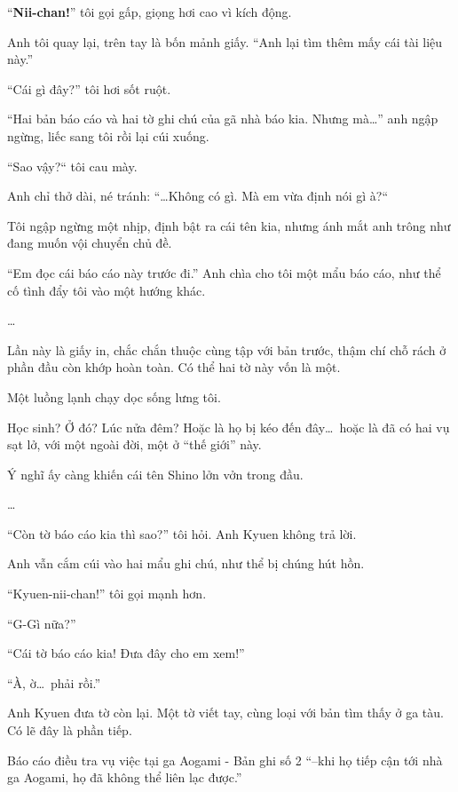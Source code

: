 \documentclass[../main.tex]{subfiles}
\begin{document}
``\textbf{Nii-chan!}'' tôi gọi gấp, giọng hơi cao vì kích động.

Anh tôi quay lại, trên tay là bốn mảnh giấy. ``Anh lại tìm thêm mấy cái tài liệu này.''

``Cái gì đây?'' tôi hơi sốt ruột.

``Hai bản báo cáo và hai tờ ghi chú của gã nhà báo kia. Nhưng mà\dots'' anh ngập ngừng, liếc sang tôi rồi lại cúi xuống.

``Sao vậy?`` tôi cau mày.

Anh chỉ thở dài, né tránh: ``\dots Không có gì. Mà em vừa định nói gì à?``

Tôi ngập ngừng một nhịp, định bật ra cái tên kia, nhưng ánh mắt anh trông như đang muốn vội chuyển chủ đề.

``Em đọc cái báo cáo này trước đi.'' Anh chìa cho tôi một mẩu báo cáo, như thể cố tình đẩy tôi vào một hướng khác.

\dots

Lần này là giấy in, chắc chắn thuộc cùng tập với bản trước, thậm chí chỗ rách ở phần đầu còn khớp hoàn toàn. Có thể hai tờ này vốn là một.


Một luồng lạnh chạy dọc sống lưng tôi.

Học sinh? Ở đó? Lúc nửa đêm? Hoặc là họ bị kéo đến đây\dots\ hoặc là đã có hai vụ sạt lở, với một ngoài đời, một ở ``thế giới'' này.

Ý nghĩ ấy càng khiến cái tên Shino lởn vởn trong đầu.

\dots

``Còn tờ báo cáo kia thì sao?'' tôi hỏi. Anh Kyuen không trả lời.

Anh vẫn cắm cúi vào hai mẩu ghi chú, như thể bị chúng hút hồn.

``Kyuen-nii-chan!'' tôi gọi mạnh hơn.

``G-Gì nữa?''

``Cái tờ báo cáo kia! Đưa đây cho em xem!''

``À, ờ\dots\ phải rồi.''

Anh Kyuen đưa tờ còn lại. Một tờ viết tay, cùng loại với bản tìm thấy ở ga tàu. Có lẽ đây là phần tiếp.

Báo cáo điều tra vụ việc tại ga Aogami - Bản ghi số 2
``--khi họ tiếp cận tới nhà ga Aogami, họ đã không thể liên lạc được.''
\end{document}

